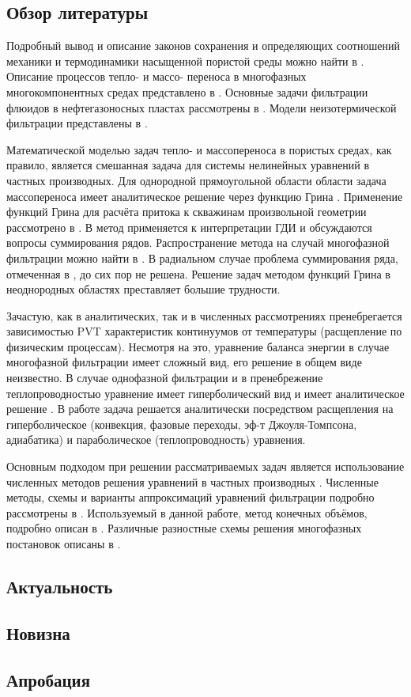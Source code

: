 \subsection*{Обзор литературы}
	Подробный вывод и описание законов сохранения и определяющих соотношений механики и термодинамики насыщенной пористой среды можно найти в \cite{kondaurov}.
	Описание процессов тепло- и массо- переноса в многофазных многокомпонентных средах представлено в \cite{nigmatulin, multiphase}. 
	Основные задачи фильтрации флюидов в нефтегазоносных пластах рассмотрены в \cite{basniev, charniy}.
	Модели неизотермической фильтрации представлены в \cite{checkalyuk, alishaev}.

	Математической моделью задач тепло- и массопереноса в пористых средах, как правило, является смешанная задача для системы нелинейных уравнений в частных производных. Для однородной прямоугольной области области задача массопереноса имеет аналитическое решение через функцию Грина \cite{vladimirov}.
	Применение функций Грина для расчёта притока к скважинам произвольной геометрии рассмотрено в \cite{aziz_green}.
	В \cite{posv1} метод применяется к интерпретации ГДИ и обсуждаются вопросы суммирования рядов.
	Распространение метода на случай многофазной фильтрации можно найти в \cite{posv2}.
	В радиальном случае проблема суммирования ряда, отмеченная в \cite{charniy}, до сих пор не решена.
	Решение задач методом функций Грина в неоднородных областях преставляет большие трудности.

	Зачастую, как в аналитических, так и в численных рассмотрениях пренебрегается зависимостью PVT характеристик континуумов от температуры (расщепление по физическим процессам). Несмотря на это, уравнение баланса энергии в случае многофазной фильтрации имеет сложный вид, его решение в общем виде неизвестно.
	В случае однофазной фильтрации и в пренебрежение теплопроводностью уравнение имеет гиперболический вид и имеет аналитическое решение \cite{checkalyuk,ramazanov_spe}.
	В работе \cite{duru} задача решается аналитически посредством расщепления на гиперболическое (конвекция, фазовые переходы, эф-т Джоуля-Томпсона, адиабатика) и параболическое (теплопроводность) уравнения.

	Основным подходом при решении рассматриваемых задач является использование численных методов решения уравнений в частных производных \cite{petrov}.
	Численные методы, схемы и варианты аппроксимаций уравнений фильтрации подробно рассмотрены в \cite{kanevskaya, aziz, chen}.
	Используемый в данной работе, метод конечных объёмов, подробно описан в \cite{leveque}.
	Различные разностные схемы решения многофазных постановок описаны в \cite{keldysh}.
	
\subsection*{Актуальность}

\subsection*{Новизна}

\subsection*{Апробация}